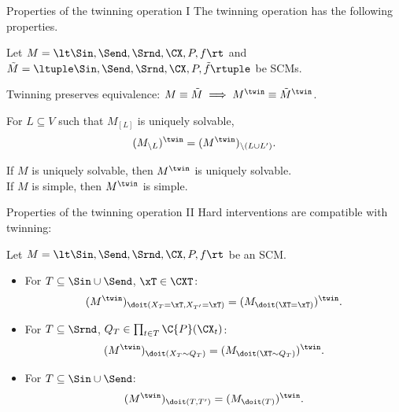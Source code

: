\begin{frame}{Properties of the twinning operation I}
The twinning operation has the following properties.

Let $M = \lt \Sin, \Send, \Srnd, \CX, P, f \rt$ and $\tilde{M} = \ltuple \Sin, \Send, \Srnd, \CX, P, \tilde{f} \rtuple$ be SCMs.

  \begin{Prp}[\ref{prp:twinning_preserves_scm_equivalence}]
  Twinning preserves equivalence: $M \equiv \tilde{M} \implies M^\twin \equiv \tilde{M}^\twin$.
  \end{Prp}
  \begin{Prp}[\ref{prp:twinning_marginalization_commute}]
  For $L \subseteq V$ such that $M_{[L]}$ is uniquely solvable,
  $$(M_{\setminus L})^\twin = (M^\twin)_{\setminus (L\cup L')}.$$
  \end{Prp}
  \begin{Prp}[\ref{prp:twin_scm_unique_solvability}]
  If $M$ is uniquely solvable, then $M^{\twin}$ is uniquely solvable.\\
  If $M$ is simple, then $M^{\twin}$ is simple.
  \end{Prp}
\end{frame}

\begin{frame}{Properties of the twinning operation II}
Hard interventions are compatible with twinning:
\begin{Prp}[\ref{prp:hard_interventions_twin_scm}]
Let $M = \lt \Sin, \Send, \Srnd, \CX, P, f \rt$ be an SCM.
\begin{itemize}
  \item For $T \subseteq \Sin \cup \Send$, $\xT \in \CXT$:
    $$(M^\twin)_{\doit(X_T=\xT,X_{T'}=\xT)} = (M_{\doit(\XT=\xT)})^\twin.$$
  \item For $T \subseteq \Srnd$, $Q_T \in \prod_{t\in T} \C{P}(\CX_t)$:
    $$(M^\twin)_{\doit(X_T\sim Q_T)} = (M_{\doit(\XT\sim Q_T)})^\twin.$$
  \item For $T \subseteq \Sin \cup \Send$:
    $$(M^\twin)_{\doit(T,T')} = (M_{\doit(T)})^\twin.$$
\end{itemize}
\end{Prp}
\end{frame}

